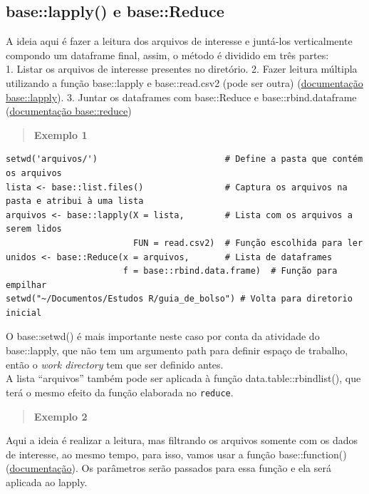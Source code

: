 \documentclass[
]{book}
\theoremstyle{definition}
\theoremstyle{definition}
\theoremstyle{definition}
\theoremstyle{definition}
\theoremstyle{remark}
\begin{document}
\hypertarget{baselapply-e-basereduce}{%
\subsection{base::lapply() e base::Reduce}\label{baselapply-e-basereduce}}

A ideia aqui é fazer a leitura dos arquivos de interesse e juntá-los verticalmente compondo um dataframe final, assim, o método é dividido em três partes:\\
1. Listar os arquivos de interesse presentes no diretório.
2. Fazer leitura múltipla utilizando a função base::lapply e base::read.csv2 (pode ser outra) (\href{https://www.rdocumentation.org/packages/base/versions/3.6.2/topics/lapply}{documentação base::lapply}).
3. Juntar os dataframes com base::Reduce e base::rbind.dataframe (\href{https://www.rdocumentation.org/packages/purrr/versions/0.2.5/topics/reduce}{documentação base::reduce})

\begin{quote}
\textbf{Exemplo 1}
\end{quote}

\begin{verbatim}
setwd('arquivos/')                         # Define a pasta que contém os arquivos
lista <- base::list.files()                # Captura os arquivos na pasta e atribui à uma lista
arquivos <- base::lapply(X = lista,        # Lista com os arquivos a serem lidos
                         FUN = read.csv2)  # Função escolhida para ler
unidos <- base::Reduce(x = arquivos,       # Lista de dataframes
                       f = base::rbind.data.frame)  # Função para empilhar
setwd("~/Documentos/Estudos R/guia_de_bolso") # Volta para diretorio inicial
\end{verbatim}

O base::setwd() é mais importante neste caso por conta da atividade do base::lapply, que não tem um argumento path para definir espaço de trabalho, então o \emph{work directory} tem que ser definido antes.\\
A lista ``arquivos'' também pode ser aplicada à função data.table::rbindlist(), que terá o mesmo efeito da função elaborada no \texttt{reduce}.

\begin{quote}
\textbf{Exemplo 2}
\end{quote}

Aqui a ideia é realizar a leitura, mas filtrando os arquivos somente com os dados de interesse, ao mesmo tempo, para isso, vamos usar a função base::function() (\href{https://www.rdocumentation.org/packages/base/versions/3.6.2/topics/function}{documentação}). Os parâmetros serão passados para essa função e ela será aplicada ao lapply.
\end{document}
